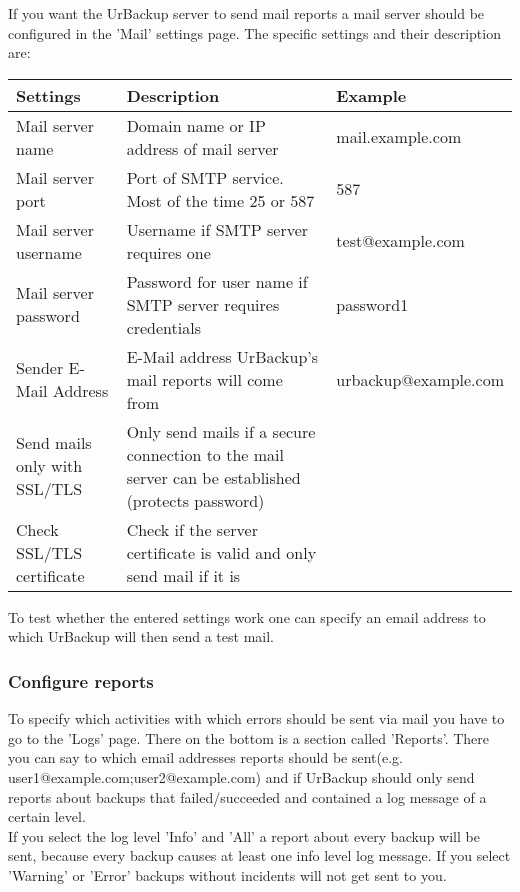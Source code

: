 \documentclass[a4paper,10pt]{article} \usepackage[breaklinks=true]{hyperref}
\begin{document}
If you want the UrBackup server to send mail reports a mail server should be configured in the 'Mail' settings page. The specific settings and their description are:

\begin{longtable}{|p{}|p{}|p{}|}
\hline
Settings  & Description & Example\\
\hline\hline
Mail server name & Domain name or IP address of mail server & mail.example.com \\
\hline
Mail server port & Port of SMTP service. Most of the time 25 or 587 & 587 \\
\hline
Mail server username & Username if SMTP server requires one & test@example.com \\
\hline
Mail server password & Password for user name if SMTP server requires credentials & password1 \\
\hline
Sender E-Mail Address & E-Mail address UrBackup's mail reports will come from & urbackup@example.com \\
\hline
Send mails only with SSL/TLS & Only send mails if a secure connection to the mail server can be established (protects password) & \\
\hline
Check SSL/TLS certificate & Check if the server certificate is valid and only send mail if it is & \\
\hline
\end{longtable}

To test whether the entered settings work one can specify an email address to which UrBackup will then send a test mail.

\subsubsection{Configure reports}
\label{subsub:configure_reports}

To specify which activities with which errors should be sent via mail you have to go to the 'Logs' page. There on the bottom is a section called 'Reports'.
There you can say to which email addresses reports should be sent(e.g. user1@example.com;user2@example.com) and if UrBackup should only send reports about backups that
failed/succeeded and contained a log message of a certain level.\\
If you select the log level 'Info' and 'All' a report about every backup will be sent, because every backup causes at least one info level log message. If you select 'Warning' or 'Error' backups without incidents will not get sent to you.
\end{document}

